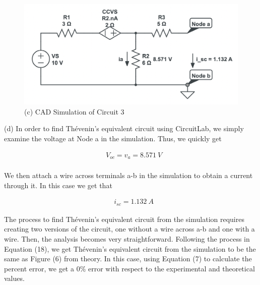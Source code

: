 \documentclass[12pt]{article}
\begin{document}
\begin{figure}[H]
    \begin{center}
        \includegraphics[scale=0.6]{circuit-3-sol.png}
        \caption { (c) CAD Simulation of Circuit 3 }
    \end{center}
\end{figure}

(d) In order to find Thévenin's equivalent circuit using CircuitLab, we simply examine the voltage at Node a in the simulation. Thus, we quickly get

\begin{equation}
    \begin{split}
        &V_{oc} = v_a = \SI{8.571}{V} \\
    \end{split}
\end{equation}

We then attach a wire across terminals a-b in the simulation to obtain a current through it. In this case we get that

\begin{equation}
    \begin{split}
        &i_{sc} = \SI{1.132}{A}
    \end{split}
\end{equation}

The process to find Thévenin's equivalent circuit from the simulation requires creating two versions of the circuit, one without a wire across a-b and one with a wire. Then, the analysis becomes very straightforward. Following the process in Equation (18), we get Thévenin's equivalent circuit from the simulation to be the same as Figure (6) from theory. In this case, using Equation (7) to calculate the percent error, we get a 0\% error with respect to the experimental and theoretical values.

\pagebreak
\end{document}
